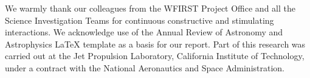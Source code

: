 
We warmly thank our colleagues from the WFIRST Project Office and all the Science Investigation Teams for continuous constructive and stimulating interactions. We acknowledge use of the Annual Review of Astronomy and Astrophysics LaTeX template as a basis for our report. Part of this research was carried out at the Jet Propulsion Laboratory, California Institute of Technology, under a contract with the National Aeronautics and Space Administration.
